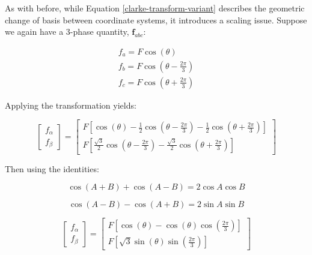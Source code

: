 \documentclass{article}
\begin{document}
As with before, while Equation \ref{clarke-transform-variant} describes the geometric change of basis between coordinate systems, it introduces a scaling issue. Suppose we again have a 3-phase quantity, $\mathbf{f}_{abc}$:

\begin{equation}
    \begin{gathered}
        f_a = F\cos(\theta) \\[5pt]
        f_b = F\cos(\theta - \frac{2\pi}{3}) \\[5pt]
        f_c = F\cos(\theta + \frac{2\pi}{3})
    \end{gathered}
\end{equation}

Applying the transformation yields:

\begin{equation}
    \begin{bmatrix}
        f_\alpha \\[1pt]
        f_\beta
    \end{bmatrix}
    =
    \begin{bmatrix}
        F\left[\cos(\theta) - \frac{1}{2}\cos(\theta - \frac{2\pi}{3}) - \frac{1}{2}\cos(\theta + \frac{2\pi}{3})\right] \\[1pt]
        F\left[\frac{\sqrt{3}}{2}\cos(\theta - \frac{2\pi}{3}) - \frac{\sqrt{3}}{2}\cos(\theta + \frac{2\pi}{3})\right]
    \end{bmatrix}
\end{equation}

Then using the identities:

\begin{equation}
    \cos(A+B) + \cos(A-B) = 2\cos{A}\cos{B}
\end{equation}

\begin{equation}
    \cos(A-B) - \cos(A+B) = 2\sin{A}\sin{B}
\end{equation}

\begin{equation}
    \begin{bmatrix}
        f_\alpha \\[1pt]
        f_\beta
    \end{bmatrix}
    =
    \begin{bmatrix}
        F\left[\cos(\theta) - \cos(\theta)\cos(\frac{2\pi}{3})\right] \\[1pt]
        F\left[\sqrt{3}\sin(\theta)\sin(\frac{2\pi}{3})\right]
    \end{bmatrix}
\end{equation}
\end{document}
